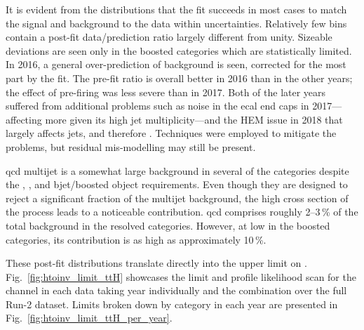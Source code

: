 It is evident from the distributions that the fit succeeds in most cases to match the signal and background to the data within uncertainties. Relatively few bins contain a post-fit data/prediction ratio largely different from unity. Sizeable deviations are seen only in the \ttH boosted categories which are statistically limited. In 2016, a general over-prediction of background is seen, corrected for the most part by the fit. The pre-fit ratio is overall better in 2016 than in the other years; the effect of pre-firing was less severe than in 2017. Both of the later years suffered from additional problems such as noise in the \acrshort{ecal} end caps in 2017---affecting \ttH more given its high jet multiplicity---and the HEM issue in 2018 that largely affects \glspl{jet}, and therefore \ptvecmiss. Techniques were employed to mitigate the problems, but residual mis-modelling may still be present.

\acrshort{qcd} multijet is a somewhat large background in several of the categories despite the \mindphi, \omegaTilde, and \gls{bjet}/boosted object requirements. Even though they are designed to reject a significant fraction of the multijet background, the high cross section of the process leads to a noticeable contribution. \acrshort{qcd} comprises roughly 2--3\,\% of the total background in the resolved categories. However, at low \ptmiss in the boosted categories, its contribution is as high as approximately 10\,\%.

These post-fit distributions translate directly into the upper limit on \BRHinvFull. Fig.~\ref{fig:htoinv_limit_ttH} showcases the limit and profile likelihood scan for the \ttH channel in each data taking year individually and the combination over the full Run-2 dataset. Limits broken down by category in each year are presented in Fig.~\ref{fig:htoinv_limit_ttH_per_year}.


